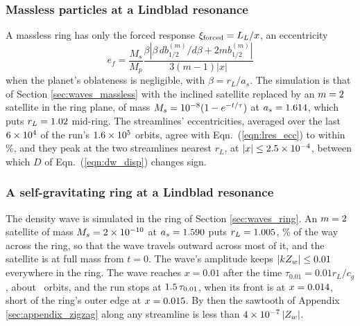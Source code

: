 \documentclass[twocolumn]{aastex702}
\begin{document}
\subsubsection{Massless particles at a Lindblad resonance}
\label{sec:density_massless}

A massless ring has only the forced response $\xi_{\rm forced} = L_L/x$, an eccentricity
\begin{equation}
    \label{eqn:lres_ecc}
    e_f = \frac{M_s}{M_p}\frac{\beta\left|\beta\,db_{1/2}^{(m)}/d\beta + 2mb_{1/2}^{(m)}\right|}{3(m - 1)|x|}
\end{equation}
when the planet's oblateness is negligible, with $\beta = r_L/a_s$. The simulation is that of
Section \ref{sec:waves_massless} with the inclined satellite replaced by an $m = 2$ satellite in the ring plane, of
mass $M_s = 10^{-8}(1 - e^{-t/\tau})$ at $a_s = 1.614$, which puts $r_L = 1.02$ mid-ring. The streamlines'
eccentricities, averaged over the last $6\times10^{4}$ of the run's $1.6\times10^{5}$ orbits, agree with
Eqn.\ (\ref{eqn:lres_ecc}) to within \lresAgreePercent\%, and they peak at the two streamlines nearest $r_L$,
at $|x| \le 2.5\times10^{-4}$, between which $D$ of Eqn.\ (\ref{eqn:dw_disp}) changes sign.

\subsubsection{A self-gravitating ring at a Lindblad resonance}
\label{sec:density_ring}

The density wave is simulated in the ring of Section \ref{sec:waves_ring}. An $m = 2$ satellite of mass
$M_s = 2\times10^{-10}$ at $a_s = 1.590$ puts $r_L = 1.005$, \dwAcrossPercent\% of the way across the ring, so that the wave
travels outward across most of it, and the satellite is at full mass from $t = 0$. The wave's amplitude keeps
$|kZ_w| \le 0.01$ everywhere in the ring. The wave reaches $x = 0.01$ after the time $\tau_{0.01} = 0.01r_L/c_g$,
about \dwTauOrbits\ orbits, and the run stops at $1.5\,\tau_{0.01}$, when its front is at $x = 0.014$,
short of the ring's outer edge at $x = 0.015$. By then the sawtooth of Appendix \ref{sec:appendix_zigzag} along
any streamline is less than $4\times10^{-7}\,|Z_w|$.
\end{document}

